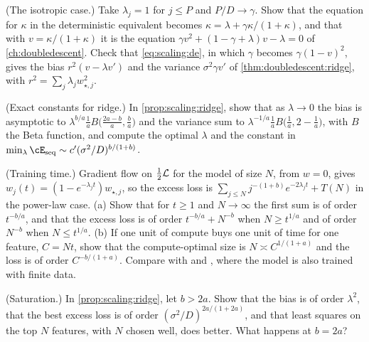 \begin{refsection}
\begin{exercises}
\item \consolidation (The isotropic case.) Take $\lambda_j=1$ for $j\le P$ and $P/D\to\gamma$. Show that the equation for $\kappa$ in the deterministic equivalent becomes $\kappa=\lambda+\gamma\kappa/(1+\kappa)$, and that with $v=\kappa/(1+\kappa)$ it is the equation $\gamma v^2+(1-\gamma+\lambda)v-\lambda=0$ of \cref{ch:doubledescent}. Check that \eqref{eq:scaling:de}, in which $\gamma$ becomes $\gamma(1-v)^2$, gives the bias $r^2(v-\lambda v')$ and the variance $\sigma^2\gamma v'$ of \cref{thm:doubledescent:ridge}, with $r^2=\sum_j\lambda_jw_{\star,j}^2$. \label{ex:scaling:isotropic}

\item \consolidation (Exact constants for ridge.) In \cref{prop:scaling:ridge}, show that as $\lambda\to0$ the bias is asymptotic to $\lambda^{b/a}\frac1aB\bigl(\frac{2a-b}a,\frac ba\bigr)$ and the variance sum to $\lambda^{-1/a}\frac1aB\bigl(\frac1a,2-\frac1a\bigr)$, with $B$ the Beta function, and compute the optimal $\lambda$ and the constant in $\min_\lambda\cE_{\mathrm{seq}}\sim c'(\sigma^2/D)^{b/(1+b)}$. \label{ex:scaling:beta}

\item \variation (Training time.) Gradient flow on $\frac12\mathcal{L}$ for the model of size $N$, from $w=0$, gives $w_j(t)=(1-e^{-\lambda_jt})w_{\star,j}$, so the excess loss is $\sum_{j\le N}j^{-(1+b)}e^{-2\lambda_jt}+T(N)$ in the power-law case. (a) Show that for $t\ge1$ and $N\to\infty$ the first sum is of order $t^{-b/a}$, and that the excess loss is of order $t^{-b/a}+N^{-b}$ when $N\ge t^{1/a}$ and of order $N^{-b}$ when $N\le t^{1/a}$. (b) If one unit of compute buys one unit of time for one feature, $C=Nt$, show that the compute-optimal size is $N\asymp C^{1/(1+a)}$ and the loss is of order $C^{-b/(1+a)}$. Compare with \textcite{BordelonEtAl2024} and \textcite{PaquetteEtAl2024}, where the model is also trained with finite data.\label{ex:scaling:time}

\item \variation (Saturation.) In \cref{prop:scaling:ridge}, let $b>2a$. Show that the bias is of order $\lambda^2$, that the best excess loss is of order $(\sigma^2/D)^{2a/(1+2a)}$, and that least squares on the top $N$ features, with $N$ chosen well, does better. What happens at $b=2a$?\label{ex:scaling:saturation}


\end{exercises}
\end{refsection}
